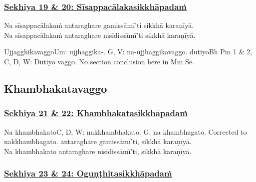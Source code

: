 \subsubsection*{\hyperref[training19-20]{Sekhiya 19 \& 20: Sīsappacālakasikkhāpadaṁ}}
\label{sekh19-20}

Na sīsappacālakaṁ antaraghare gamissāmī'ti sikkhā karaṇīyā.\\
Na sīsappacālakaṁ antaraghare nisīdissāmī'ti sikkhā karaṇīyā.

\begin{center}
	Ujjagghikavaggo\makeatletter\hyperlink{endnote-appendix}\makeatother Um: ujjhaggika-. G, V: na-ujjhaggikavaggo. dutiyo\makeatletter\hyperlink{endnote-appendix}\makeatother Bh Pm 1 & 2, C, D, W: Dutiyo vaggo. No section conclusion here in Mm Se.
\end{center}



\subsection{Khambhakatavaggo}

\subsubsection*{\hyperref[training21-22]{Sekhiya 21 \& 22: Khambhakatasikkhāpadaṁ}}
\label{sekh21-22}

Na khambhakato\makeatletter\hyperlink{endnote-appendix}\makeatother C, D, W: nakkhambhakato. G: na khambhagato. Corrected to nakkhambhagato. antaraghare gamissāmī'ti, sikkhā karaṇīyā.\\
Na khambhakato antaraghare nisīdissāmī'ti, sikkhā karaṇīyā.



\subsubsection*{\hyperref[training23-24]{Sekhiya 23 \& 24: Oguṇṭhitasikkhāpadaṁ}}
\label{sekh23-24}

